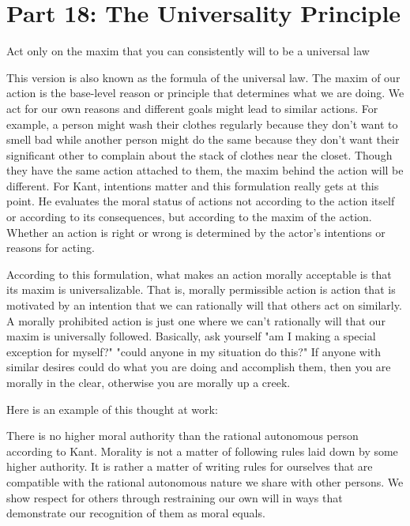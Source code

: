 \chapter{Part 18: The Universality Principle}
\begin{center}
Act only on the maxim that you can consistently will to be a universal law
\end{center}
This version is also known as the formula of the universal law. The maxim of our action is the base-level reason or principle that determines what we are doing. We act for our own reasons and different goals might lead to similar actions. For example, a person might wash their clothes regularly because they don't want to smell bad while another person might do the same because they don't want their significant other to complain about the stack of clothes near the closet. Though they have the same action attached to them, the maxim behind the action will be different.  For Kant, intentions matter and this formulation really gets at this point. He evaluates the moral status of actions not according to the action itself or according to its consequences, but according to the maxim of the action. Whether an action is right or wrong  is determined by the actor’s intentions or reasons for acting.

According to this formulation, what makes an action morally acceptable is that its maxim is universalizable. That is, morally permissible action is action that is motivated by an intention that we can rationally will that others act on similarly. A morally prohibited action is just one where we can’t rationally will that our maxim is universally followed. Basically, ask yourself "am I making a special exception for myself?" "could anyone in my situation do this?" If anyone with similar desires could do what you are doing and accomplish them, then you are morally in the clear, otherwise you are morally up a creek.

Here is an example of this thought at work:


There is no higher moral authority than the rational autonomous person according to Kant. Morality is not a matter of following rules laid down by some higher authority. It is rather a matter of writing rules for ourselves that are compatible with the rational autonomous nature we share with other persons. We show respect for others through restraining our own will in ways that demonstrate our recognition of them as moral equals.

